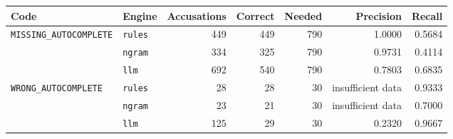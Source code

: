 \begingroup\small\setlength{\tabcolsep}{4pt}
\begin{tabular}{llrrrrr}
\toprule
\textbf{Code} & \textbf{Engine} & \textbf{Accusations} & \textbf{Correct} & \textbf{Needed} & \textbf{Precision} & \textbf{Recall} \\
\midrule
\texttt{MISSING\_AUTOCOMPLETE} & \texttt{rules} & 449 & 449 & 790 & 1.0000 & 0.5684 \\  %
 & \texttt{ngram} & 334 & 325 & 790 & 0.9731 & 0.4114 \\  %
 & \texttt{llm} & 692 & 540 & 790 & 0.7803 & 0.6835 \\  %
\midrule
\texttt{WRONG\_AUTOCOMPLETE} & \texttt{rules} & 28 & 28 & 30 & insufficient data & 0.9333 \\  %
 & \texttt{ngram} & 23 & 21 & 30 & insufficient data & 0.7000 \\  %
 & \texttt{llm} & 125 & 29 & 30 & 0.2320 & 0.9667 \\  %
\bottomrule
\end{tabular}
\endgroup
\par\smallskip{}
